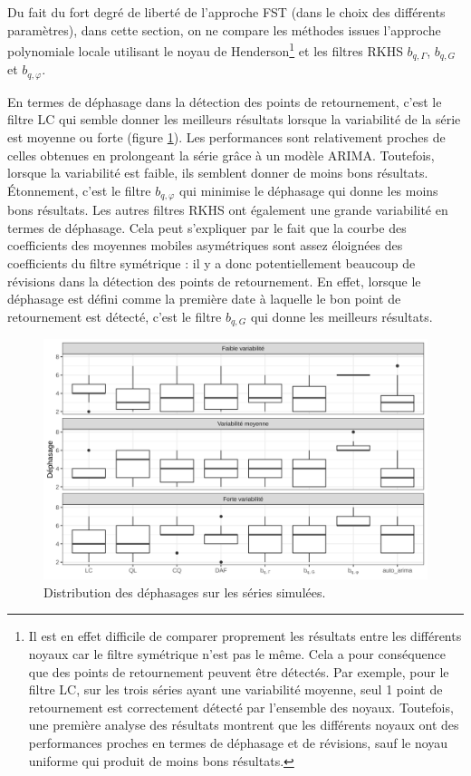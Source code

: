 \documentclass[
  12pt,
  a4paper,french]{article}
\newcommand\1{\mathds{1}}
\begin{document}
Du fait du fort degré de liberté de l'approche FST (dans le choix des différents paramètres), dans cette section, on ne compare les méthodes issues l'approche polynomiale locale utilisant le noyau de Henderson\footnote{
  Il est en effet difficile de comparer proprement les résultats entre les différents noyaux car le filtre symétrique n'est pas le même. Cela a pour conséquence que des points de retournement peuvent être détectés. Par exemple, pour le filtre LC, sur les trois séries ayant une variabilité moyenne, seul 1 point de retournement est correctement détecté par l'ensemble des noyaux.
  Toutefois, une première analyse des résultats montrent que les différents noyaux ont des performances proches en termes de déphasage et de révisions, sauf le noyau uniforme qui produit de moins bons résultats.} et les filtres RKHS \(b_{q,\Gamma}\), \(b_{q,G}\) et \(b_{q,\varphi}\).

En termes de déphasage dans la détection des points de retournement, c'est le filtre LC qui semble donner les meilleurs résultats lorsque la variabilité de la série est moyenne ou forte (figure \ref{fig:graphstpsimul}).
Les performances sont relativement proches de celles obtenues en prolongeant la série grâce à un modèle ARIMA.
Toutefois, lorsque la variabilité est faible, ils semblent donner de moins bons résultats.
Étonnement, c'est le filtre \(b_{q,\varphi}\) qui minimise le déphasage qui donne les moins bons résultats. Les autres filtres RKHS ont également une grande variabilité en termes de déphasage.
Cela peut s'expliquer par le fait que la courbe des coefficients des moyennes mobiles asymétriques sont assez éloignées des coefficients du filtre symétrique : il y a donc potentiellement beaucoup de révisions dans la détection des points de retournement.
En effet, lorsque le déphasage est défini comme la première date à laquelle le bon point de retournement est détecté, c'est le filtre \(b_{q,G}\) qui donne les meilleurs résultats.

\begin{figure}

{\centering \includegraphics[width=1\linewidth]{img/simulations/phase_shift_simul} 

}

\caption[Distribution des déphasages sur les séries simulées]{Distribution des déphasages sur les séries simulées.}\label{fig:graphstpsimul}

\footnotesize
\normalsize\end{figure}
\end{document}
